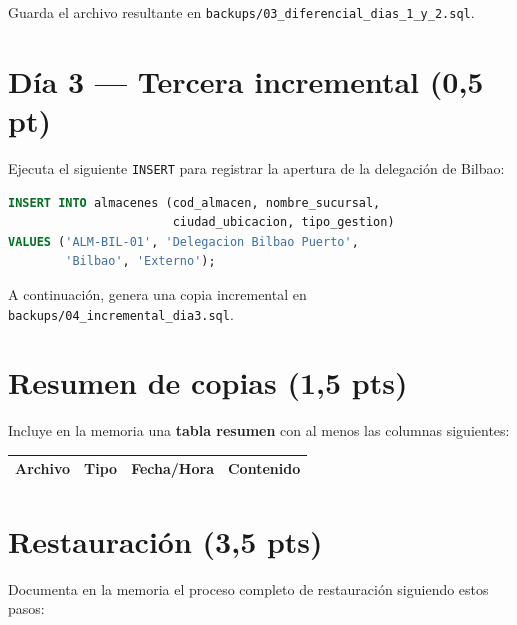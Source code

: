\documentclass[a4paper,11pt]{article}
\begin{document}
\begin{Form}
Guarda el archivo resultante en \texttt{backups/03\_diferencial\_dias\_1\_y\_2.sql}.

\section{Día 3 — Tercera incremental \textnormal{(0,5 pt)}}

Ejecuta el siguiente \texttt{INSERT} para registrar la apertura de la delegación de Bilbao:

\begin{lstlisting}[language=SQL]
INSERT INTO almacenes (cod_almacen, nombre_sucursal,
                       ciudad_ubicacion, tipo_gestion)
VALUES ('ALM-BIL-01', 'Delegacion Bilbao Puerto',
        'Bilbao', 'Externo');
\end{lstlisting}

A continuación, genera una copia incremental en \texttt{backups/04\_incremental\_dia3.sql}.

\section{Resumen de copias \textnormal{(1,5 pts)}}

Incluye en la memoria una \textbf{tabla resumen} con al menos las columnas siguientes:

\begin{center}
\begin{tabular}{|l|l|l|l|}
    \hline
    \textbf{Archivo} & \textbf{Tipo} & \textbf{Fecha/Hora} & \textbf{Contenido} \\ \hline
\end{tabular}
\end{center}

\section{Restauración \textnormal{(3,5 pts)}}

Documenta en la memoria el proceso completo de restauración siguiendo estos pasos:


\end{Form}
\end{document}

